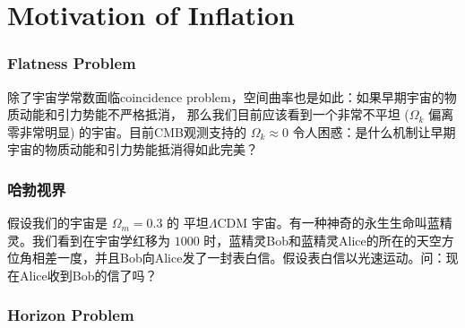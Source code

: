 \documentclass[CJK,13pt]{beamer}
\date{}
\begin{document}
  \bch

  \section{Motivation of Inflation}

  
  \begin{frame}
    \frametitle{Flatness Problem}
    除了宇宙学常数面临coincidence problem，空间曲率也是如此：如果早期宇宙的物质动能和引力势能不严格抵消， 那么我们目前应该看到一个非常不平坦 ($\Omega_k$ 偏离零非常明显) 的宇宙。目前CMB观测支持的 $\Omega_k\approx 0$ 令人困惑：是什么机制让早期宇宙的物质动能和引力势能抵消得如此完美？

    
  \end{frame}


  \begin{frame}
    \frametitle{哈勃视界}

    假设我们的宇宙是 $\Omega_m=0.3$ 的 平坦$\Lambda$CDM 宇宙。有一种神奇的永生生命叫蓝精灵。我们看到在宇宙学红移为 $1000$ 时，蓝精灵Bob和蓝精灵Alice的所在的天空方位角相差一度，并且Bob向Alice发了一封表白信。假设表白信以光速运动。问：现在Alice收到Bob的信了吗？
    
  \end{frame}
  
  \begin{frame}
    \frametitle{Horizon Problem}
    
    
  \end{frame}
  
    \ech
\end{document}
